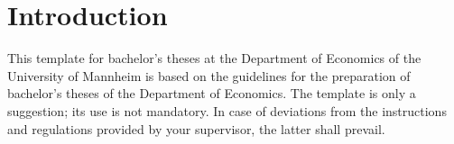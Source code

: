 
\chapter{Introduction}
This template for bachelor's theses at the Department of Economics of the University of Mannheim is based on the guidelines for the preparation of bachelor's theses of the Department of Economics. The template is only a suggestion; its use is not mandatory. In case of deviations from the instructions and regulations provided by your supervisor, the latter shall prevail.
